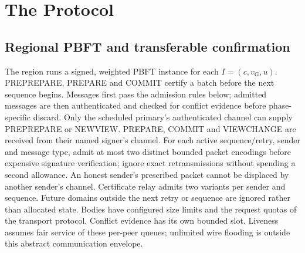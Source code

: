 \documentclass[11pt,a4paper,onecolumn]{article}
\newcommand{\gv}{v_{\mathrm G}}
\theoremstyle{remark}\newtheorem{example}[definition]{Example}
\newcounter{protocol}
\begin{document}
\section{The Protocol}\label{sec:protocol}

\subsection{Regional PBFT and transferable confirmation}\label{sec:regional}
The region runs a signed, weighted PBFT instance for each $I=(c,\gv,u)$.
PREPREPARE, PREPARE and COMMIT certify a batch before the next sequence begins.
Messages first pass the admission rules below; admitted messages are then
authenticated and checked for conflict evidence before phase-specific discard.
Only the scheduled primary's authenticated channel can supply PREPREPARE or
NEWVIEW. PREPARE, COMMIT and VIEWCHANGE are received from their named signer's
channel. For each active sequence/retry, sender and message type, admit at most
two distinct bounded packet encodings before expensive signature verification;
ignore exact retransmissions without spending a second allowance. An honest
sender's prescribed packet cannot be displaced by another sender's channel.
Certificate relay admits two variants per sender and sequence. Future domains
outside the next retry or sequence are ignored rather than allocated state.
Bodies have configured size limits and the request quotas of the transport
protocol. Conflict evidence has its own bounded slot. Liveness assumes fair
service of these per-peer queues; unlimited wire flooding is outside this
abstract communication envelope.
\end{document}
